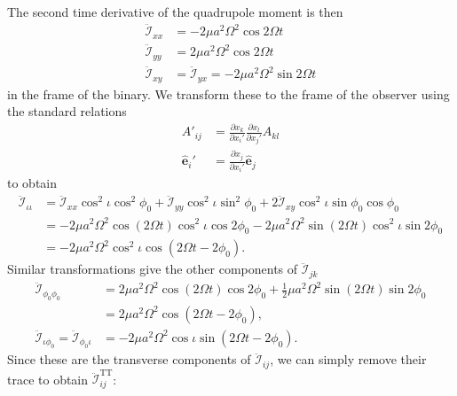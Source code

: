 The second time derivative of the quadrupole moment is then
\begin{align}
\ddot{\mathcal{I}}_{xx} &= - 2\mu a^2 \Omega^2 \cos 2\Omega t \\
\ddot{\mathcal{I}}_{yy} &= 2\mu a^2 \Omega^2 \cos 2\Omega t \\
\ddot{\mathcal{I}}_{xy} &=
\ddot{\mathcal{I}}_{yx} = - 2\mu a^2 \Omega^2 \sin 2\Omega t
\end{align}
in the frame of the binary. We transform these to the frame of the observer
using the standard relations
\begin{align}
A'_{ij} &= 
\frac{\partial x_k}{\partial x_i'}
\frac{\partial x_l}{\partial x_j'} A_{kl} \\
\hat{\boldsymbol{e}}_{i}' &= 
\frac{\partial x_j}{\partial x_i'}\hat{\boldsymbol{e}}_{j}
\end{align}
to obtain
\begin{equation}
\begin{split}
\ddot{\mathcal{I}}_{\iota\iota} &= 
\ddot{\mathcal{I}}_{xx} \cos^2 \iota \cos^2 \phi_0 
+  \ddot{\mathcal{I}}_{yy} \cos^2 \iota \sin^2 \phi_0 
+ 2  \ddot{\mathcal{I}}_{xy} \cos^2\iota\sin\phi_0\cos\phi_0 \\
&= - 2\mu a^2 \Omega^2 \cos(2\Omega t) \cos^2\iota \cos 2\phi_0
-2 \mu a^2 \Omega^2 \sin(2\Omega t) \cos^2\iota \sin 2\phi_0 \\
&= -2 \mu a^2 \Omega^2 \cos^2\iota \cos\left(2\Omega t - 2 \phi_0\right).
\end{split}
\end{equation}
Similar transformations give the other components of $\ddot{\mathcal{I}}_{jk}$
\begin{align}
\ddot{\mathcal{I}}_{\phi_0\phi_0} &=
2\mu a^2 \Omega^2 \cos(2\Omega t) \cos 2\phi_0
+ \frac{1}{2} \mu a^2 \Omega^2 \sin(2\Omega t) \sin 2\phi_0 \nonumber\\
&= 2\mu a^2\Omega^2\cos\left(2\Omega t - 2 \phi_0\right), \\
\ddot{\mathcal{I}}_{\iota\phi_0} = 
\ddot{\mathcal{I}}_{\phi_0\iota} &= 
- 2 \mu a^2 \Omega^2 \cos\iota \sin\left(2\Omega t - 2\phi_0\right).
\end{align}
Since these are the transverse components of $\ddot{\mathcal{I}}_{ij}$, we can
simply remove their trace to obtain $\ddot{\mathcal{I}}_{ij}^\mathrm{TT}$:
